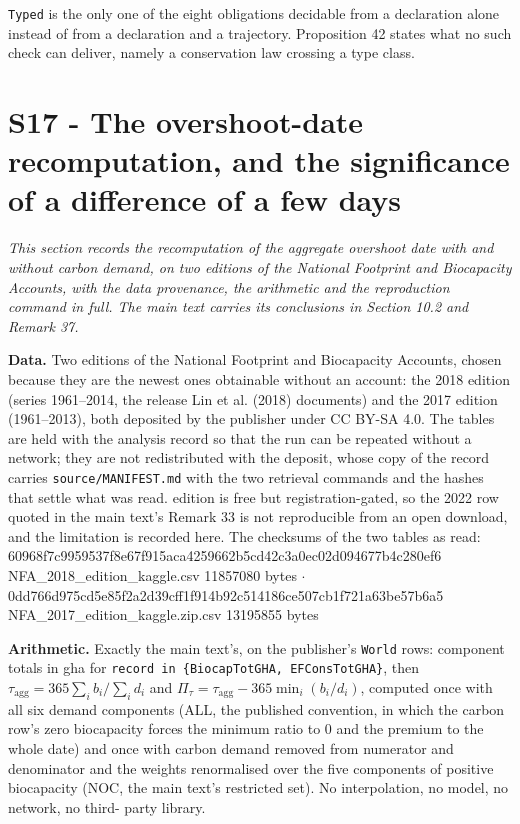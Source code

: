 \documentclass[11pt]{article}
\begin{document}
\texttt{Typed} is the only one of the eight obligations decidable from a declaration alone instead of from a declaration and a trajectory. Proposition 42 states what no such check can deliver, namely a conservation law crossing a type class.

\section*{S17 - The overshoot-date recomputation, and the significance of a difference of a few days}\label{s17---the-overshoot-date-recomputation-and-the-significance-of-a-diffe}

\emph{This section records the recomputation of the aggregate overshoot date with and without carbon demand, on two editions of the National Footprint and Biocapacity Accounts, with the data provenance, the arithmetic and the reproduction command in full. The main text carries its conclusions in Section 10.2 and Remark 37.}

\textbf{Data.} Two editions of the National Footprint and Biocapacity Accounts, chosen because they are the newest ones obtainable without an account: the 2018 edition (series 1961--2014, the release Lin et al. (2018) documents) and the 2017 edition (1961--2013), both deposited by the publisher under CC BY-SA 4.0. The tables are held with the analysis record so that the run can be repeated without a network; they are not redistributed with the deposit, whose copy of the record carries \texttt{source/\allowbreak{}MANIFEST.\allowbreak{}md} with the two retrieval commands and the hashes that settle what was read. edition is free but registration-gated, so the 2022 row quoted in the main text's Remark 33 is not reproducible from an open download, and the limitation is recorded here. The checksums of the two tables as read: 60968f7c9959537f\allowbreak{}8e67f915aca42596\allowbreak{}62b5cd42c3a0ec02\allowbreak{}d094677b4c280ef6 NFA\_2018\_edition\_kaggle.csv 11857080 bytes \(\cdot\) 0dd766d975cd5e85\allowbreak{}f2a2d39cff1f914b\allowbreak{}92c514186ce507cb\allowbreak{}1f721a63be57b6a5 NFA\_2017\_edition\_kaggle.zip.csv 13195855 bytes

\textbf{Arithmetic.} Exactly the main text's, on the publisher's \texttt{World} rows: component totals in gha for \texttt{record in \{B\allowbreak{}iocapTotGHA,\allowbreak{} EFConsTotGH\allowbreak{}A\}}, then \(\tau_{\mathrm{agg}} = 365\sum_i b_i/\sum_i d_i\) and \(\Pi_\tau = \tau_{\mathrm{agg}} - 365\min_i(b_i/\allowbreak{}d_i)\), computed once with all six demand components (ALL, the published convention, in which the carbon row's zero biocapacity forces the minimum ratio to 0 and the premium to the whole date) and once with carbon demand removed from numerator and denominator and the weights renormalised over the five components of positive biocapacity (NOC, the main text's restricted set). No interpolation, no model, no network, no third- party library.
\end{document}
